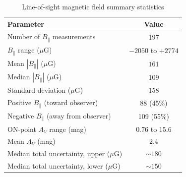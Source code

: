 \documentclass[twocolumn]{aastex631}
\begin{document}
\begin{table}
\centering
\caption{Line-of-sight magnetic field summary statistics}
\label{tab:blos-summary}
\begin{tabular}{lc}
\toprule
Parameter & Value \\
\midrule
Number of $B_\parallel$ measurements & 197 \\
\midrule
$B_\parallel$ range ($\mu$G) & $-2050$ to $+2774$ \\
Mean $|B_\parallel|$ ($\mu$G) & $161$ \\
Median $|B_\parallel|$ ($\mu$G) & $109$ \\
Standard deviation ($\mu$G) & $158$ \\
\midrule
Positive $B_\parallel$ (toward observer) & 88 (45\%) \\
Negative $B_\parallel$ (away from observer) & 109 (55\%) \\
\midrule
ON-point $A_V$ range (mag) & $0.76$ to $15.6$ \\
Mean $A_V$ (mag) & $2.4$ \\
\midrule
Median total uncertainty, upper ($\mu$G) & $\sim180$ \\
Median total uncertainty, lower ($\mu$G) & $\sim150$ \\
\bottomrule
\end{tabular}
\end{table}
\end{document}
